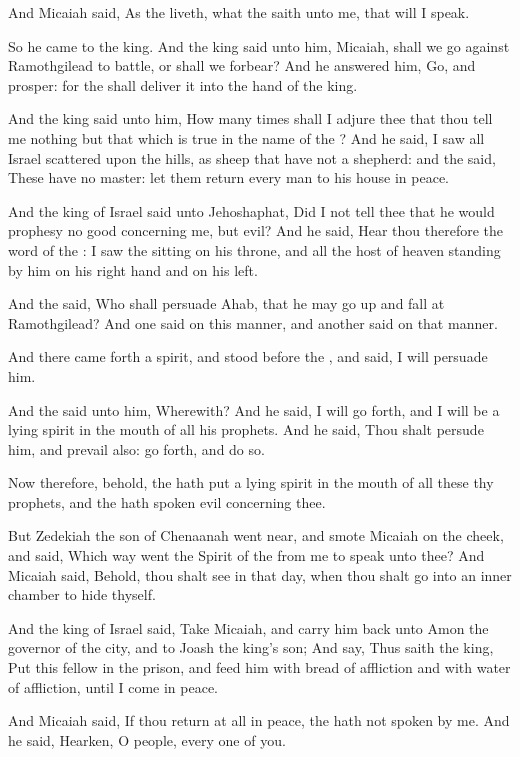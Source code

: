 \verse And Micaiah said, As the \LORD liveth, what the \LORD saith unto me, that will I speak.

\verse So he came to the king. And the king said unto him, Micaiah, shall we go against Ramothgilead to battle, or shall we forbear? And he answered him, Go, and prosper: for the \LORD shall deliver it into the hand of the king.

\verse And the king said unto him, How many times shall I adjure thee that thou tell me nothing but that which is true in the name of the \LORD?  \verse And he said, I saw all Israel scattered upon the hills, as sheep that have not a shepherd: and the \LORD said, These have no master: let them return every man to his house in peace.

\verse And the king of Israel said unto Jehoshaphat, Did I not tell thee that he would prophesy no good concerning me, but evil?  \verse And he said, Hear thou therefore the word of the \LORD: I saw the \LORD sitting on his throne, and all the host of heaven standing by him on his right hand and on his left.

\verse And the \LORD said, Who shall persuade Ahab, that he may go up and fall at Ramothgilead? And one said on this manner, and another said on that manner.

\verse And there came forth a spirit, and stood before the \LORD, and said, I will persuade him.

\verse And the \LORD said unto him, Wherewith? And he said, I will go forth, and I will be a lying spirit in the mouth of all his prophets.  And he said, Thou shalt persude him, and prevail also: go forth, and do so.

\verse Now therefore, behold, the \LORD hath put a lying spirit in the mouth of all these thy prophets, and the \LORD hath spoken evil concerning thee.

\verse But Zedekiah the son of Chenaanah went near, and smote Micaiah on the cheek, and said, Which way went the Spirit of the \LORD from me to speak unto thee?  \verse And Micaiah said, Behold, thou shalt see in that day, when thou shalt go into an inner chamber to hide thyself.

\verse And the king of Israel said, Take Micaiah, and carry him back unto Amon the governor of the city, and to Joash the king's son; \verse And say, Thus saith the king, Put this fellow in the prison, and feed him with bread of affliction and with water of affliction, until I come in peace.

\verse And Micaiah said, If thou return at all in peace, the \LORD hath not spoken by me. And he said, Hearken, O people, every one of you.

